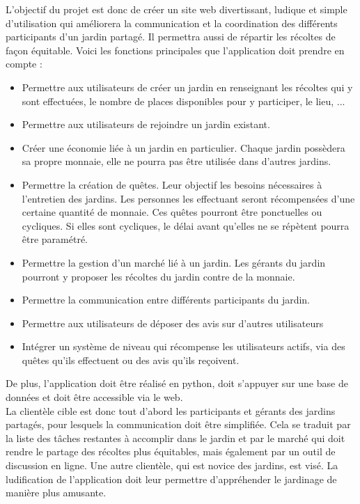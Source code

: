 \documentclass{report}
\begin{document}
    L'objectif du projet est donc de créer un site web divertissant, ludique et simple d’utilisation qui améliorera la communication et la coordination des différents participants d’un jardin partagé. Il permettra aussi de répartir les récoltes de façon équitable. Voici les fonctions principales que l'application doit prendre en compte :
    \begin{itemize}
        \item Permettre aux utilisateurs de créer un jardin en renseignant les récoltes qui y sont effectuées, le nombre de places disponibles pour y participer, le lieu, ...
        \item Permettre aux utilisateurs de rejoindre un jardin existant.
        \item Créer une économie liée à un jardin en particulier. Chaque jardin possèdera sa propre monnaie, elle ne pourra pas être utilisée dans d’autres jardins.
        \item Permettre la création de quêtes. Leur objectif les besoins nécessaires à l’entretien des jardins. Les personnes les effectuant seront récompensées d’une certaine quantité de monnaie. Ces quêtes pourront être ponctuelles ou cycliques. Si elles sont cycliques, le délai avant qu'elles ne se répètent pourra être paramétré.
        \item Permettre la gestion d'un marché lié à un jardin. Les gérants du jardin pourront y proposer les récoltes du jardin contre de la monnaie. \item Permettre la communication entre différents participants du jardin.
        \item Permettre aux utilisateurs de déposer des avis sur d'autres utilisateurs 
        \item Intégrer un système de niveau qui récompense les utilisateurs actifs, via des quêtes qu'ils effectuent ou des avis qu'ils reçoivent.
    \end{itemize}

    De plus, l'application doit être réalisé en python, doit s'appuyer sur une base de données et doit être accessible via le web.\\
    
    La clientèle cible est donc tout d'abord les participants et gérants des jardins partagés, pour lesquels la communication doit être simplifiée. Cela se traduit par la liste des tâches restantes à accomplir dans le jardin et par le marché qui doit rendre le partage des récoltes plus équitables, mais également par un outil de discussion en ligne.
    Une autre clientèle, qui est novice des jardins, est visé. La ludification de l'application doit leur permettre d'appréhender le jardinage de manière plus amusante.
    
\end{document}
